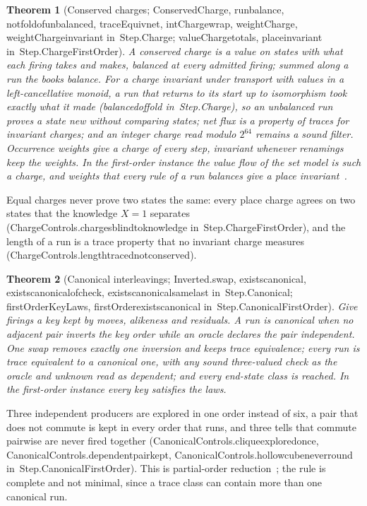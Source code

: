 \documentclass[11pt]{article}
\newtheorem{theorem}{Theorem}
\theoremstyle{remark}
\newcommand{\lean}[1]{{\ttfamily\def\_{\textunderscore\allowbreak}#1}}
\newcommand{\inmod}[1]{in~{\ttfamily\def\_{\textunderscore\allowbreak}#1}}
\begin{document}
\begin{theorem}[Conserved charges; \lean{ConservedCharge}, \lean{run\_balance}, \lean{not\_fold\_of\_unbalanced}, \lean{traceEquiv\_net}, \lean{intCharge\_wrap}, \lean{weightCharge}, \lean{weightCharge\_invariant} \inmod{Step.Charge}; \lean{valueCharge\_totals}, \lean{place\_invariant} \inmod{Step.ChargeFirstOrder}]
A conserved charge is a value on states with what each firing takes and makes, balanced at every
admitted firing; summed along a run the books balance. For a charge invariant under transport with
values in a left-cancellative monoid, a run that returns to its start up to isomorphism took exactly
what it made (\lean{balanced\_of\_fold} \inmod{Step.Charge}), so an unbalanced run proves a state new without comparing
states; net flux is a property of traces for invariant charges; and an integer charge read modulo
$2^{64}$ remains a sound filter. Occurrence weights give a charge of every step, invariant whenever
renamings keep the weights. In the first-order instance the value flow of the set model is such a
charge, and weights that every rule of a run balances give a place invariant~\cite{murata89}.
\end{theorem}
Equal charges never prove two states the same: every place charge agrees on two states that the
knowledge $X = 1$ separates (\lean{ChargeControls.charges\_blind\_to\_knowledge}
\inmod{Step.ChargeFirstOrder}), and the length of a run is a trace property that no invariant charge
measures (\lean{ChargeControls.length\_traced\_not\_conserved}).

\begin{theorem}[Canonical interleavings; \lean{Inverted.swap}, \lean{exists\_canonical}, \lean{exists\_canonical\_of\_check}, \lean{exists\_canonical\_same\_last} \inmod{Step.Canonical}; \lean{firstOrderKeyLaws}, \lean{firstOrder\_exists\_canonical} \inmod{Step.CanonicalFirstOrder}]
Give firings a key kept by moves, alikeness and residuals. A run is canonical when no adjacent pair
inverts the key order while an oracle declares the pair independent. One swap removes exactly one
inversion and keeps trace equivalence; every run is trace equivalent to a canonical one, with any sound
three-valued check as the oracle and unknown read as dependent; and every end-state class is reached. In
the first-order instance every key satisfies the laws.
\end{theorem}
Three independent producers are explored in one order instead of six, a pair that does not commute is
kept in every order that runs, and three tells that commute pairwise are never fired together
(\lean{CanonicalControls.clique\_explored\_once}, \lean{CanonicalControls.dependent\_pair\_kept},
\lean{CanonicalControls.hollow\_cube\_never\_round} \inmod{Step.CanonicalFirstOrder}). This is partial-order
reduction~\cite{godefroid96}; the rule is complete and not minimal, since a trace class can contain more
than one canonical run.
\end{document}
